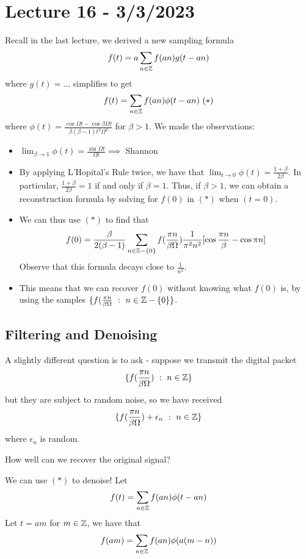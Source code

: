 \documentclass{article}
\begin{document}
\newpage
\section{Lecture 16 - 3/3/2023}


Recall in the last lecture, we derived a new sampling formula
\[f(t) = a \sum_{n \in \mathbb{Z}} f(an) g(t - an)\]
where $g(t) = ...$ simplifies to get
\begin{align*}
    f(t) = \sum_{n \in \mathbb{Z}} f(an) \phi(t - an)\ (*)
\end{align*}
where $\phi(t) = \frac{\cos \Omega t - \cos \beta \Omega t}{\beta(\beta - 1)t^2\Omega^2}$ for $\beta > 1$. We made the observations:
\begin{itemize}
    \item $\lim_{\beta \to 1} \phi(t) = \frac{\sin \Omega t}{\Omega t} \implies $ Shannon
    \item By applying L'Hopital's Rule twice, we have that $\lim_{t \to 0} \phi(t) = \frac{1 + \beta}{2\beta}$. In particular, $\frac{1 + \beta}{2\beta} = 1$ if and only if $\beta = 1$. Thus, if $\beta > 1$, we can obtain a reconstruction formula by solving for $f(0)$ in $(*)$ when $(t = 0)$.
    \item We can thus use $(*)$ to find that
    \[f(0) = \frac{\beta}{2(\beta - 1)} \sum_{n \in \mathbb{Z} - \{0\}} f(\frac{\pi n}{\beta \Omega}) \frac{1}{\pi^2 n^2} [\cos \frac{\pi n}{\beta} - \cos \pi n]\]
    Observe that this formula decays close to $\frac{1}{n^2}$.
    \item This means that we can recover $f(0)$ without knowing what $f(0)$ is, by using the samples $\{f(\frac{\pi n}{\beta \Omega}\ :\ n \in \mathbb{Z} - \{0\}\}$.
\end{itemize}

\subsection{Filtering and Denoising}

A slightly different question is to ask - suppose we transmit the digital packet
    \[\{f(\frac{\pi n}{\beta \Omega})\ :\ n \in \mathbb{Z}\}\]
    but they are subject to random noise, so we have received
    \[\{f(\frac{\pi n}{\beta \Omega}) + \epsilon_n \ :\ n \in \mathbb{Z}\}\]
    where $\epsilon_n$ is random.

\begin{question}
    How well can we recover the original signal?
\end{question}

We can use $(*)$ to denoise! Let
\[f(t) = \sum_{n \in \mathbb{Z}} f(an) \phi(t - an)\]
Let $t = am$ for $m \in \mathbb{Z}$, we have that
\[f(am) = \sum_{n \in \mathbb{Z}} f(an) \phi(a(m - n))\]
\end{document}
